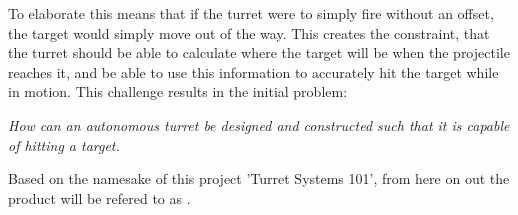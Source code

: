To elaborate this means that if the turret were to simply fire without an
offset, the target would simply move out of the way. This creates the
constraint, that the turret should be able to calculate where the target will be
when the projectile reaches it, and be able to use this information to
accurately hit the target while in motion. This challenge results in the initial
problem:

\begin{center}
\begin{minipage}{0.8\linewidth}
\textit{How can an autonomous turret be designed and constructed such that it is
capable of hitting a target.}
\end{minipage}
\end{center}

Based on the namesake of this project 'Turret Systems 101', from here on out the
product will be refered to as \namep.
